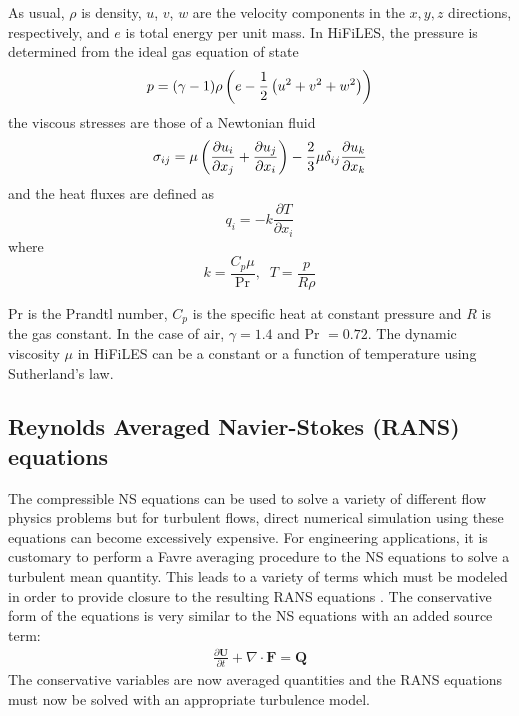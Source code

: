 As usual, $\rho$ is density, $u$, $v$, $w$ are the velocity components in the $x, y, z$ directions, respectively, and $e$ is total energy per unit mass. In HiFiLES, the pressure is determined from the ideal gas equation of state
\begin{equation}
p = (\gamma - 1)\rho\left(e - \frac{1}{2}\left(u^2 + v^2 + w^2\right)\right)
\end{equation}
the viscous stresses are those of a Newtonian fluid
\begin{equation}\label{sigma}
\sigma_{ij} = \mu\left( \frac{\partial u_i}{\partial x_j}
+ \frac{\partial u_j}{\partial x_i} \right)
- \frac{2}{3}\mu \delta_{ij}\frac{\partial u_k}{\partial x_k}
\end{equation}
and the heat fluxes are defined as
\begin{equation}
q_i = -k \frac{\partial T}{\partial x_i}
\end{equation}
where
\begin{equation}
k = \frac{C_p \mu}{\text{Pr}} , \;\; T = \frac{p}{R \rho}
\end{equation}

Pr is the Prandtl number, $C_p$ is the specific heat at constant pressure and $R$ is the gas constant. In the case of air, $\gamma = 1.4$ and Pr $= 0.72$. The dynamic viscosity $\mu$ in HiFiLES can be a constant or a function of temperature using Sutherland's law.


\subsection{Reynolds Averaged Navier-Stokes (RANS) equations}
The compressible NS equations can be used to solve a variety of different flow physics problems but for turbulent flows, direct numerical simulation using these equations can become excessively expensive. For engineering applications, it is customary to perform a Favre averaging procedure to the NS equations to solve a turbulent mean quantity. This leads to a variety of terms which must be modeled in order to provide closure to the resulting RANS equations \cite{wilcox1998turbulence,oliver2008high}. The conservative form of the equations is very similar to the NS equations with an added source term:
\begin{align}
	\frac{\partial \boldsymbol{U}}{\partial t} + \nabla \cdot \boldsymbol{F} = \boldsymbol{Q}
\end{align}
The conservative variables are now averaged quantities and the RANS equations must now be solved with an appropriate turbulence model.
